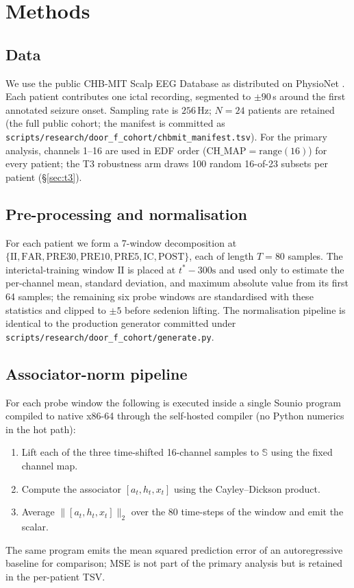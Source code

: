 \documentclass[11pt,twocolumn]{article}
\begin{document}
\section{Methods}\label{sec:methods}

\subsection{Data}
We use the public CHB-MIT Scalp EEG Database
\cite{shoeb2009} as distributed on PhysioNet
\cite{goldberger2000physionet}. Each patient contributes one ictal
recording, segmented to $\pm 90$\,s around the first annotated
seizure onset. Sampling rate is $256$\,Hz; $N=24$ patients are
retained (the full public cohort; the manifest is committed as
\texttt{scripts/research/door\_f\_cohort/chbmit\_manifest.tsv}).
For the primary analysis, channels 1--16 are used in EDF order
($\mathrm{CH\_MAP}=\mathrm{range}(16)$) for every patient; the
T3 robustness arm draws 100 random 16-of-23 subsets per patient
(\S\ref{sec:t3}).

\subsection{Pre-processing and normalisation}
For each patient we form a 7-window decomposition at
$\{\mathrm{II},\mathrm{FAR},\mathrm{PRE30},\mathrm{PRE10},
\mathrm{PRE5},\mathrm{IC},\mathrm{POST}\}$, each of length
$T=80$ samples. The interictal-training window $\mathrm{II}$ is
placed at $t^{\ast}-300\text{s}$ and used only to estimate the
per-channel mean, standard deviation, and maximum absolute value
from its first 64 samples; the remaining six probe windows are
standardised with these statistics and clipped to $\pm 5$ before
sedenion lifting. The normalisation pipeline is identical to the
production generator committed under
\texttt{scripts/research/door\_f\_cohort/generate.py}.

\subsection{Associator-norm pipeline}
For each probe window the following is executed inside a single
Sounio program compiled to native x86-64 through the self-hosted
compiler (no Python numerics in the hot path):
\begin{enumerate}
\item Lift each of the three time-shifted 16-channel samples to
      $\mathbb{S}$ using the fixed channel map.
\item Compute the associator $[a_t,h_t,x_t]$ using the
      Cayley--Dickson product.
\item Average $\|[a_t,h_t,x_t]\|_2$ over the 80 time-steps of the
      window and emit the scalar.
\end{enumerate}
The same program emits the mean squared prediction error of an
autoregressive baseline for comparison; MSE is not part of the
primary analysis but is retained in the per-patient TSV.
\end{document}
